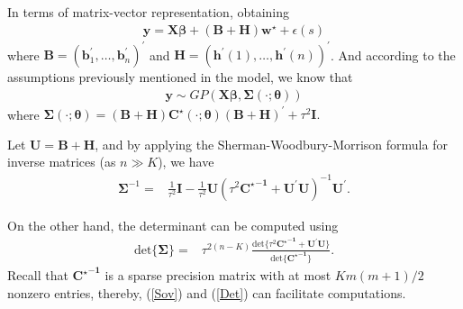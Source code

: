 \documentclass[
12pt, %
a4paper, %
oneside, %
headinclude,footinclude, %
BCOR5mm, %
]{scrartcl}
\begin{document}
\begin{itemize}
In terms of matrix-vector representation, obtaining
\begin{equation}
\begin{aligned}
\boldsymbol{y} = \boldsymbol{X}\boldsymbol{\beta} + \left(\boldsymbol{B} + \boldsymbol{H}\right)\boldsymbol{w}^{\star} + \epsilon(s)
\end{aligned} \label{DP12}
\end{equation}
where $\boldsymbol{B} = \left(\boldsymbol{b}^\prime_1, \dots, \boldsymbol{b}^\prime_n\right)^\prime$ and $\boldsymbol{H} = \left(\boldsymbol{h}^\prime(1), \dots, \boldsymbol{h}^\prime(n)\right)^\prime$. And according to the assumptions previously mentioned in the model, we know that
\begin{equation}
\begin{aligned}
\boldsymbol{y} \sim GP\left(\boldsymbol{X}\boldsymbol{\beta}, \boldsymbol{\Sigma}(\cdot; \boldsymbol{\theta})\right)
\end{aligned} \label{DP13}
\end{equation}
where $\boldsymbol{\Sigma}(\cdot; \boldsymbol{\theta}) = \left(\boldsymbol{B} + \boldsymbol{H}\right) \boldsymbol{{C}^{\star}}(\cdot; \boldsymbol{\theta})\left(\boldsymbol{B} + \boldsymbol{H}\right)^\prime + \tau^2\boldsymbol{I}.$

Let $\boldsymbol{U} = \boldsymbol{B} + \boldsymbol{H}$, and by applying the Sherman-Woodbury-Morrison formula for inverse matrices (as $n \gg K$), we have
\begin{equation}
\begin{aligned}
  \boldsymbol{\Sigma}^{-1} = & \frac{1}{\tau^2}\boldsymbol{I} - \frac{1}{\tau^2}\boldsymbol{U}
  \left(\tau^2\boldsymbol{{{C}^{\star}}^{-1}} + \boldsymbol{U}^\prime\boldsymbol{U}\right)^{-1}\boldsymbol{U}^\prime.
\end{aligned} \label{Sov}
\end{equation}

On the other hand, the determinant can be computed using
\begin{equation}
\begin{aligned}
  \text{det}\{\boldsymbol{\Sigma}\} = &  \tau^{2(n - K)} \frac{\text{det}\{\tau^2\boldsymbol{{{C}^{\star}}^{-1}} +  \boldsymbol{U}^\prime\boldsymbol{U}\}}{\text{det}\{\boldsymbol{{{C}^{\star}}^{-1}}\}}.
\end{aligned}\label{Det}
\end{equation}
Recall that $\boldsymbol{{{C}^{\star}}^{-1}}$ is a sparse precision matrix with at most $Km(m + 1)/2$ nonzero entries, thereby, (\ref{Sov}) and (\ref{Det}) can facilitate computations.


\end{itemize}
\end{document}
